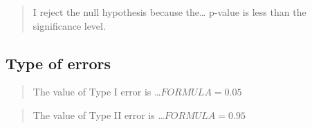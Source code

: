 \documentclass[
]{article}
\begin{document}
\begin{quote}
I reject the null hypothesis because the\ldots{} p-value is less than
the significance level.
\end{quote}

\hypertarget{type-of-errors}{%
\subsection{Type of errors}\label{type-of-errors}}

\begin{quote}
The value of Type I error is \ldots{}\emph{\(FORMULA = 0.05\)}
\end{quote}

\begin{quote}
The value of Type II error is \ldots{}\emph{\(FORMULA = 0.95\)}
\end{quote}
\end{document}
